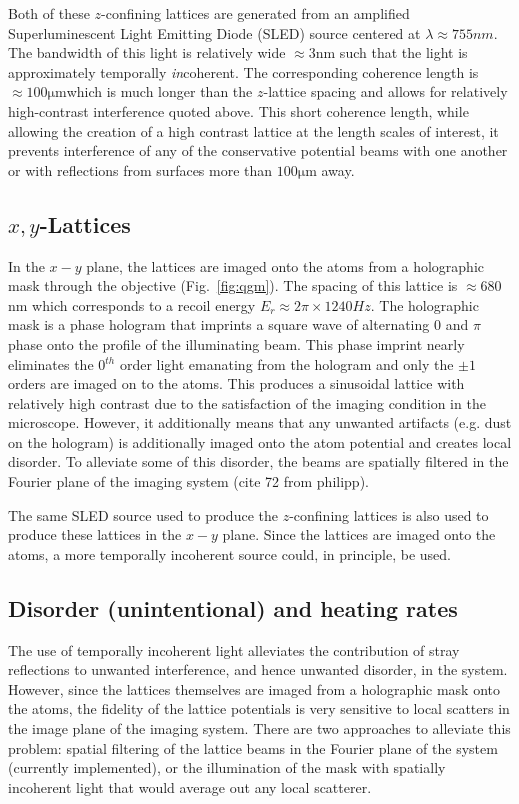 Both of these $z$-confining lattices are generated from an amplified Superluminescent Light Emitting Diode (SLED) source centered at $\lambda \approx 755 nm$. The bandwidth of this light is relatively wide $\approx 3 \mathrm{nm}$ such that the light is approximately temporally \emph{in}coherent. The corresponding coherence length is $\approx 100 \mathrm{\mu m}$which is much longer than the $z$-lattice spacing and allows for relatively high-contrast interference quoted above. This short coherence length, while allowing the creation of a high contrast lattice at the length scales of interest, it prevents interference of any of the conservative potential beams with one another or with reflections from surfaces more than $100 \mathrm{\mu m}$ away.

\subsection{$x,y$-Lattices}

In the $x-y$ plane, the lattices are imaged onto the atoms from a holographic mask through the objective (Fig.~\ref{fig:qgm}). The spacing of this lattice is $\approx 680$ nm which corresponds to a recoil energy $E_r \approx 2 \pi \times 1240 Hz$. The holographic mask is a phase hologram that imprints a square wave of alternating $0$ and $\pi$ phase onto the profile of the illuminating beam. This phase imprint nearly eliminates the 0$^{th}$ order light emanating from the hologram and only the $\pm1$ orders are imaged on to the atoms. This produces a sinusoidal lattice with relatively high contrast due to the satisfaction of the imaging condition in the microscope. However, it additionally means that any unwanted artifacts (e.g. dust on the hologram) is additionally imaged onto the atom potential and creates local disorder. To alleviate some of this disorder, the beams are spatially filtered in the Fourier plane of the imaging system (cite 72 from philipp).

The same SLED source used to produce the $z$-confining lattices is also used to produce these lattices in the $x-y$ plane. Since the lattices are imaged onto the atoms, a more temporally incoherent source could, in principle, be used.

\subsection{Disorder (unintentional) and heating rates} \label{sec:ch2_heating}

The use of temporally incoherent light alleviates the contribution of stray reflections to unwanted interference, and hence unwanted disorder, in the system. However, since the lattices themselves are imaged from a holographic mask onto the atoms, the fidelity of the lattice potentials is very sensitive to local scatters in the image plane of the imaging system. There are two approaches to alleviate this problem: spatial filtering of the lattice beams in the Fourier plane of the system (currently implemented), or the illumination of the mask with spatially incoherent light that would average out any local scatterer.

